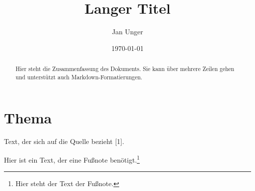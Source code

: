 \documentclass{vorlage-design-main}
\title{Langer Titel}
\author{Jan Unger}
\date{\today}
\newlength{\cslhangindent}
\newenvironment{CSLReferences}%
  {\setlength{\parindent}{0pt}%
   \everypar{\setlength{\hangindent}{\cslhangindent}}\ignorespaces}%
  {\par}
\begin{document}
\maketitle

\begin{abstract}
Hier steht die Zusammenfassung des Dokuments. Sie kann über mehrere
Zeilen gehen und unterstützt auch Markdown-Formatierungen.
\end{abstract}

\section{Thema}\label{thema}

Text, der sich auf die Quelle bezieht {[}1{]}.

Hier ist ein Text, der eine Fußnote benötigt.\footnote{Hier steht der
  Text der Fußnote.}

\label{refs}
\begin{CSLReferences}{0}{0}
\CSLLeftMargin{{[}1{]} }%

\end{CSLReferences}


\clearpage
\printbibliography
\end{document}
